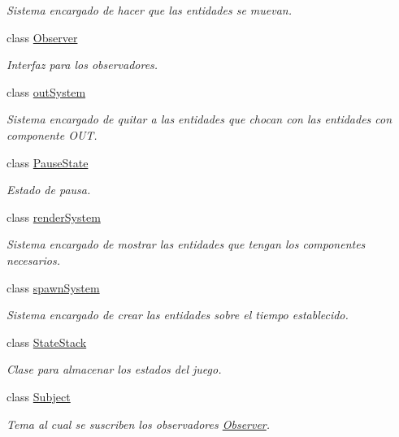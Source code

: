 \begin{DoxyCompactItemize}
\begin{DoxyCompactList}\small\item\em Sistema encargado de hacer que las entidades se muevan. \end{DoxyCompactList}\item 
class \hyperlink{classant_1_1_observer}{Observer}
\begin{DoxyCompactList}\small\item\em Interfaz para los observadores. \end{DoxyCompactList}\item 
class \hyperlink{classant_1_1out_system}{out\+System}
\begin{DoxyCompactList}\small\item\em Sistema encargado de quitar a las entidades que chocan con las entidades con componente O\+U\+T. \end{DoxyCompactList}\item 
class \hyperlink{classant_1_1_pause_state}{Pause\+State}
\begin{DoxyCompactList}\small\item\em Estado de pausa. \end{DoxyCompactList}\item 
class \hyperlink{classant_1_1render_system}{render\+System}
\begin{DoxyCompactList}\small\item\em Sistema encargado de mostrar las entidades que tengan los componentes necesarios. \end{DoxyCompactList}\item 
class \hyperlink{classant_1_1spawn_system}{spawn\+System}
\begin{DoxyCompactList}\small\item\em Sistema encargado de crear las entidades sobre el tiempo establecido. \end{DoxyCompactList}\item 
class \hyperlink{classant_1_1_state_stack}{State\+Stack}
\begin{DoxyCompactList}\small\item\em Clase para almacenar los estados del juego. \end{DoxyCompactList}\item 
class \hyperlink{classant_1_1_subject}{Subject}
\begin{DoxyCompactList}\small\item\em Tema al cual se suscriben los observadores \hyperlink{classant_1_1_observer}{Observer}. \end{DoxyCompactList}\item 

\end{DoxyCompactItemize}
